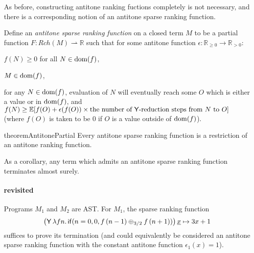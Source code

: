 As before, constructing antitone ranking fuctions completely is not necessary, and there is a corresponding notion of an antitone sparse ranking function.

Define an \emph{antitone sparse ranking function} on a closed term $M$ to be a partial function $F : Rch(M) \rightharpoonup \mathbb{R}$ such that for some antitone function $\epsilon : \mathbb{R}_{\geq 0} \to \mathbb{R}_{>0}$:
\begin{inparaenum}[(i)]
\item $f(N) \geq 0$ for all $N \in \operatorname{dom}(f)$,
\item $M \in \operatorname{dom}(f)$,
\item for any $N \in \operatorname{dom}(f)$, evaluation of $N$ will eventually reach some $O$ which is either a value or in $\operatorname{dom}(f)$, and $f(N) \geq \mathbb E [f(O) + \epsilon(f(O)) \times \text{the number of $\tY$-reduction steps from $N$ to $O$}]$ (where $f(O)$ is taken to be 0 if $O$ is a value outside of $\operatorname{dom}(f)$).
\end{inparaenum}
\iffalse
\begin{itemize}
\item $f(N) \geq 0$ for all $N$ where $f$ is defined.
\item $f$ is defined at $M$.
\item For any $N$ in the domain of definition of $f$, evaluation of $N$ will eventually reach some $O$ which is either a value or in the domain of definition of $f$, and $f(N) \geq \mathbb E [f(O) + \epsilon(f(O)) \times \text{the number of $\tY$-reduction steps from $N$ to $O$}]$ (where $f(O)$ is taken to be 0 if $O$ is a value outside of the domain of $f$).
\end{itemize}
\fi
\begin{restatable}{theorem}{AntitonePartial}  \label{thm:antitone partial implies rankable}
  Every antitone sparse ranking function is a restriction of an antitone ranking function.
\end{restatable}

As a corollary, any term which admits an antitone sparse ranking function terminates almost surely.

\paragraph*{ revisited}
Programs $M_1$ and $M_2$ are AST. For $M_1$, the sparse ranking function 
\begin{align*}
\big(\mathsf{Y} \, \lambda f n . \, \mathsf{if}(n=0, 0, f \, (n-1) \oplus_{3/2} f \, (n+1))\big) \, \underline x \mapsto 3x + 1
\end{align*}
suffices to prove its termination (and could equivalently be considered an antitone sparse ranking function with the constant antitone function $\epsilon_1(x) = 1$).

